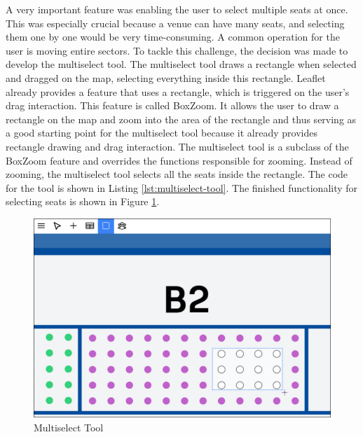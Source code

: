 A very important feature was enabling the user to select multiple seats at once. This was especially crucial because a venue can have many seats, and selecting them one by one would be very time-consuming. A common operation for the user is moving entire sectors. To tackle this challenge, the decision was made to develop the multiselect tool. The multiselect tool draws a rectangle when selected and dragged on the map, selecting everything inside this rectangle. Leaflet already provides a feature that uses a rectangle, which is triggered on the user's drag interaction. This feature is called BoxZoom. It allows the user to draw a rectangle on the map and zoom into the area of the rectangle and thus serving as a good starting point for the multiselect tool because it already provides rectangle drawing and drag interaction. The multiselect tool is a subclass of the BoxZoom feature and overrides the functions responsible for zooming. Instead of zooming, the multiselect tool selects all the seats inside the rectangle. The code for the tool is shown in Listing \ref{lst:multiselect-tool}. The finished functionality for selecting seats is shown in Figure \ref{fig:multiselect-tool}.
\begin{figure}
    \centering
    \includegraphics[scale=0.3]{pics/multiselect.png}
    \caption{Multiselect Tool}
    \label{fig:multiselect-tool}
\end{figure}

